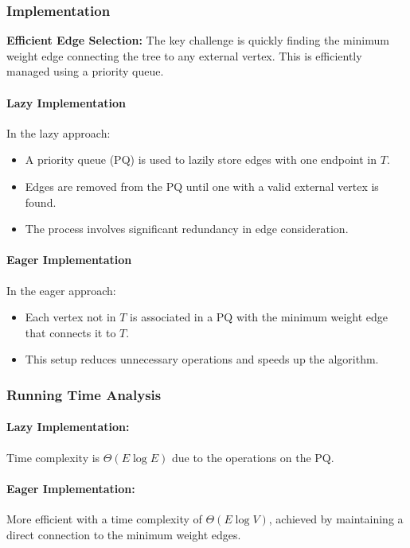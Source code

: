 \documentclass{article}
\begin{document}
\subsubsection{Implementation}

\textbf{Efficient Edge Selection:} The key challenge is quickly finding the minimum weight edge connecting the tree to any external vertex. This is efficiently managed using a priority queue.

\paragraph{Lazy Implementation}
In the lazy approach:
\begin{itemize}
  \item A priority queue (PQ) is used to lazily store edges with one endpoint in $T$.
  \item Edges are removed from the PQ until one with a valid external vertex is found.
  \item The process involves significant redundancy in edge consideration.
\end{itemize}

\paragraph{Eager Implementation}
In the eager approach:
\begin{itemize}
  \item Each vertex not in $T$ is associated in a PQ with the minimum weight edge that connects it to $T$.
  \item This setup reduces unnecessary operations and speeds up the algorithm.
\end{itemize}

\subsubsection{Running Time Analysis}
\paragraph{Lazy Implementation:} Time complexity is $\Theta(E \log E)$ due to the operations on the PQ.
\paragraph{Eager Implementation:} More efficient with a time complexity of $\Theta(E \log V)$, achieved by maintaining a direct connection to the minimum weight edges.
\end{document}

